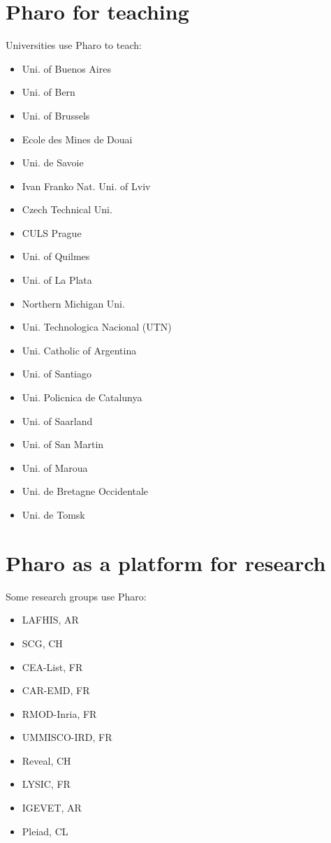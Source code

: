 \documentclass[notumble]{leaflet}
\begin{document}
\pagebreak{}

\section{Pharo for teaching}

Universities use Pharo to teach:

\begin{itemize}
\item Uni. of Buenos Aires
\item Uni. of Bern
\item Uni. of Brussels
\item Ecole des Mines de Douai
\item Uni. de Savoie
\item Ivan Franko Nat. Uni. of Lviv
\item Czech Technical Uni.
\item CULS Prague
\item Uni. of Quilmes
\item Uni. of La Plata
\item Northern Michigan Uni.
\item Uni. Technologica Nacional (UTN)
\item Uni. Catholic of Argentina
\item Uni. of Santiago
\item Uni. Policnica de Catalunya
\item Uni. of Saarland
\item Uni. of San Martin
\item Uni. of Maroua
\item Uni. de Bretagne Occidentale
\item Uni. de Tomsk 
\end{itemize}

\section{Pharo as a platform for research}

Some research groups use Pharo:

\begin{itemize}
\item LAFHIS, AR
\item SCG, CH
\item CEA-List, FR
\item CAR-EMD, FR
\item RMOD-Inria, FR
\item UMMISCO-IRD, FR
\item Reveal, CH
\item LYSIC, FR
\item IGEVET, AR
\item Pleiad, CL
\end{itemize}
\end{document}

